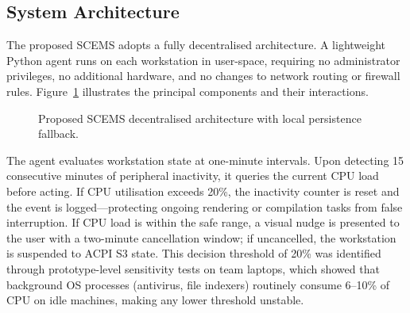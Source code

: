 \documentclass[conference]{IEEEtran}
\begin{document}
\subsection{System Architecture}

The proposed SCEMS adopts a fully decentralised architecture. A lightweight Python agent runs on each workstation in user-space, requiring no administrator privileges, no additional hardware, and no changes to network routing or firewall rules. Figure~\ref{fig:architecture} illustrates the principal components and their interactions.

\begin{figure}[t]
\centering
{}
\caption{Proposed SCEMS decentralised architecture with local persistence fallback.}
\label{fig:architecture}
\end{figure}

The agent evaluates workstation state at one-minute intervals. Upon detecting 15 consecutive minutes of peripheral inactivity, it queries the current CPU load before acting. If CPU utilisation exceeds 20\%, the inactivity counter is reset and the event is logged—protecting ongoing rendering or compilation tasks from false interruption. If CPU load is within the safe range, a visual nudge is presented to the user with a two-minute cancellation window; if uncancelled, the workstation is suspended to ACPI S3 state. This decision threshold of 20\% was identified through prototype-level sensitivity tests on team laptops, which showed that background OS processes (antivirus, file indexers) routinely consume 6–10\% of CPU on idle machines, making any lower threshold unstable.
\end{document}
